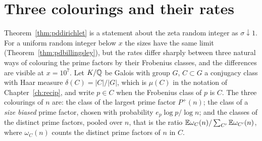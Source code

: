 \section{Three colourings and their rates}\label{sec:pdmertens}

Theorem~\ref{thm:pddirichlet} is a statement about the zeta random integer as $\sigma\downarrow1$. For a uniform random integer below $x$ the sizes have the same limit (Theorem~\ref{thm:pdbillingsley}), but the rates differ sharply between three natural ways of colouring the prime factors by their Frobenius classes, and the differences are visible at $x=10^7$. Let $K/\mathbb{Q}$ be Galois with group $G$, $C\subset G$ a conjugacy class with Haar measure $\delta(C)=|C|/|G|$, which is $\mu(C)$ in the notation of Chapter~\ref{ch:recip}, and write $p\in C$ when the Frobenius class of $p$ is $C$. The three colourings of $n$ are: the class of the largest prime factor $P^+(n)$; the class of a \emph{size biased} prime factor, chosen with probability $e_p\log p/\log n$; and the classes of the distinct prime factors, pooled over $n$, that is the ratio $\mathbb{E}\omega_C(n)/\sum_{C'}\mathbb{E}\omega_{C'}(n)$, where $\omega_C(n)$ counts the distinct prime factors of $n$ in $C$.

